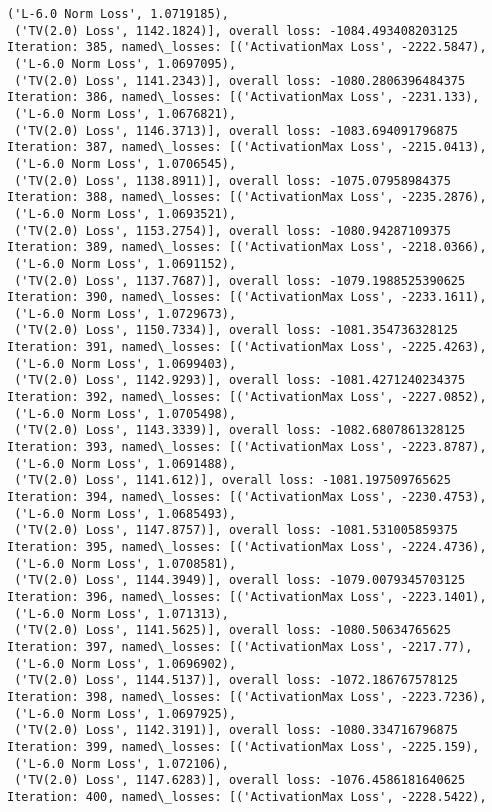 \documentclass[10pt]{article}
\begin{document}
\begin{Verbatim}[commandchars=\\\{\}]
 ('L-6.0 Norm Loss', 1.0719185),
 ('TV(2.0) Loss', 1142.1824)], overall loss: -1084.493408203125
Iteration: 385, named\_losses: [('ActivationMax Loss', -2222.5847),
 ('L-6.0 Norm Loss', 1.0697095),
 ('TV(2.0) Loss', 1141.2343)], overall loss: -1080.2806396484375
Iteration: 386, named\_losses: [('ActivationMax Loss', -2231.133),
 ('L-6.0 Norm Loss', 1.0676821),
 ('TV(2.0) Loss', 1146.3713)], overall loss: -1083.694091796875
Iteration: 387, named\_losses: [('ActivationMax Loss', -2215.0413),
 ('L-6.0 Norm Loss', 1.0706545),
 ('TV(2.0) Loss', 1138.8911)], overall loss: -1075.07958984375
Iteration: 388, named\_losses: [('ActivationMax Loss', -2235.2876),
 ('L-6.0 Norm Loss', 1.0693521),
 ('TV(2.0) Loss', 1153.2754)], overall loss: -1080.94287109375
Iteration: 389, named\_losses: [('ActivationMax Loss', -2218.0366),
 ('L-6.0 Norm Loss', 1.0691152),
 ('TV(2.0) Loss', 1137.7687)], overall loss: -1079.1988525390625
Iteration: 390, named\_losses: [('ActivationMax Loss', -2233.1611),
 ('L-6.0 Norm Loss', 1.0729673),
 ('TV(2.0) Loss', 1150.7334)], overall loss: -1081.354736328125
Iteration: 391, named\_losses: [('ActivationMax Loss', -2225.4263),
 ('L-6.0 Norm Loss', 1.0699403),
 ('TV(2.0) Loss', 1142.9293)], overall loss: -1081.4271240234375
Iteration: 392, named\_losses: [('ActivationMax Loss', -2227.0852),
 ('L-6.0 Norm Loss', 1.0705498),
 ('TV(2.0) Loss', 1143.3339)], overall loss: -1082.6807861328125
Iteration: 393, named\_losses: [('ActivationMax Loss', -2223.8787),
 ('L-6.0 Norm Loss', 1.0691488),
 ('TV(2.0) Loss', 1141.612)], overall loss: -1081.197509765625
Iteration: 394, named\_losses: [('ActivationMax Loss', -2230.4753),
 ('L-6.0 Norm Loss', 1.0685493),
 ('TV(2.0) Loss', 1147.8757)], overall loss: -1081.531005859375
Iteration: 395, named\_losses: [('ActivationMax Loss', -2224.4736),
 ('L-6.0 Norm Loss', 1.0708581),
 ('TV(2.0) Loss', 1144.3949)], overall loss: -1079.0079345703125
Iteration: 396, named\_losses: [('ActivationMax Loss', -2223.1401),
 ('L-6.0 Norm Loss', 1.071313),
 ('TV(2.0) Loss', 1141.5625)], overall loss: -1080.50634765625
Iteration: 397, named\_losses: [('ActivationMax Loss', -2217.77),
 ('L-6.0 Norm Loss', 1.0696902),
 ('TV(2.0) Loss', 1144.5137)], overall loss: -1072.186767578125
Iteration: 398, named\_losses: [('ActivationMax Loss', -2223.7236),
 ('L-6.0 Norm Loss', 1.0697925),
 ('TV(2.0) Loss', 1142.3191)], overall loss: -1080.334716796875
Iteration: 399, named\_losses: [('ActivationMax Loss', -2225.159),
 ('L-6.0 Norm Loss', 1.072106),
 ('TV(2.0) Loss', 1147.6283)], overall loss: -1076.4586181640625
Iteration: 400, named\_losses: [('ActivationMax Loss', -2228.5422),

\end{Verbatim}
\end{document}
